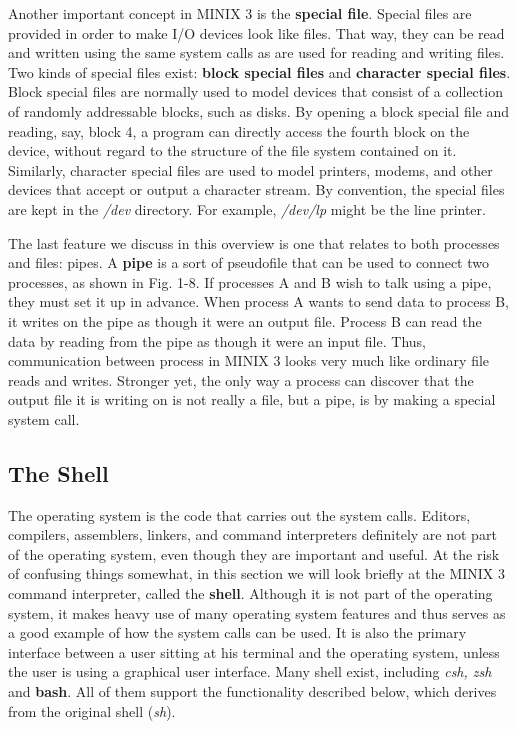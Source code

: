 \documentclass{book}
\newcommand {\kw}  [1] {\textbf{#1}}
\newcommand {\sys} [1] {\textsl{#1}}
\begin{document}
Another important concept in MINIX 3 is the \kw{special file}.
Special files are provided in order to make I/O devices look like files.
That way, they can be read and written using the same system calls as are used for reading and writing files.
Two kinds of special files exist: \kw{block special files} and \kw{character special files}.
Block special files are normally used to model devices that consist of a collection of randomly addressable blocks, such as disks.
By opening a block special file and reading, say, block 4, a program can directly access the fourth block on the device, 
without regard to the structure of the file system contained on it.
Similarly, character special files are used to model printers, modems, and other devices that accept or output a character stream.
By convention, the special files are kept in the \sys{/dev} directory.
For example, \sys{/dev/lp} might be the line printer.

The last feature we discuss in this overview is one that relates to both processes and files: pipes.
A \kw{pipe} is a sort of pseudofile that can be used to connect two processes, as shown in Fig. 1-8.
If processes A and B wish to talk using a pipe, they must set it up in advance.
When process A wants to send data to process B, it writes on the pipe as though it were an output file.
Process B can read the data by reading from the pipe as though it were an input file.
Thus, communication between process in MINIX 3 looks very much like ordinary file reads and writes.
Stronger yet, the only way a process can discover that the output file it is writing on is not really a file, 
but a pipe, is by making a special system call.

\subsection{The Shell}
The operating system is the code that carries out the system calls.
Editors, compilers, assemblers, linkers, and command interpreters definitely are not part of the operating system, 
even though they are important and useful.
At the risk of confusing things somewhat, in this section we will look briefly at the MINIX 3 command interpreter, called the \kw{shell}.
Although it is not part of the operating system, it makes heavy use of many operating system features 
and thus serves as a good example of how the system calls can be used.
It is also the primary interface between a user sitting at his terminal and the operating system, 
unless the user is using a graphical user interface.
Many shell exist, including \sys{csh, zsh} and \kw{bash}.
All of them support the functionality described below, which derives from the original shell (\sys{sh}).
\end{document}
